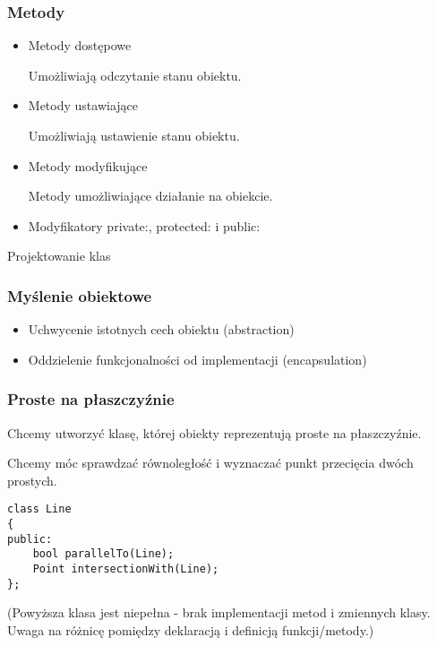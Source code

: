 \documentclass[pdftex, smaller]{beamer}
\begin{document}
\begin{frame}
\frametitle{Metody}

\begin{itemize}
\item Metody dostępowe

\vspace{2mm}
Umożliwiają odczytanie stanu obiektu.
\item Metody ustawiające

\vspace{2mm}
Umożliwiają ustawienie stanu obiektu.

\item Metody modyfikujące

\vspace{2mm}
Metody umożliwiające działanie na obiekcie.

\item Modyfikatory private:, protected: i public:
\end{itemize}

\end{frame}

\begin{frame}

\begin{center}
\Large Projektowanie klas
\end{center}
\end{frame}

\begin{frame}
\frametitle{Myślenie obiektowe}

\begin{itemize}
\item Uchwycenie istotnych cech obiektu (abstraction)

\vspace{8mm}
\item Oddzielenie funkcjonalności od implementacji (encapsulation)
\end{itemize}

\end{frame}

\begin{frame}[fragile]
\frametitle{Proste na płaszczyźnie}

Chcemy utworzyć klasę, której obiekty reprezentują proste na płaszczyźnie.

\vspace{2mm}
Chcemy móc sprawdzać równoległość i wyznaczać punkt przecięcia dwóch prostych.

\vspace{2mm}
\begin{lstlisting}
class Line
{
public:
	bool parallelTo(Line);
	Point intersectionWith(Line);
};
\end{lstlisting}

(Powyższa klasa jest niepełna - brak implementacji metod i zmiennych klasy. Uwaga na różnicę pomiędzy deklaracją i definicją funkcji/metody.)
\end{frame}
\end{document}
